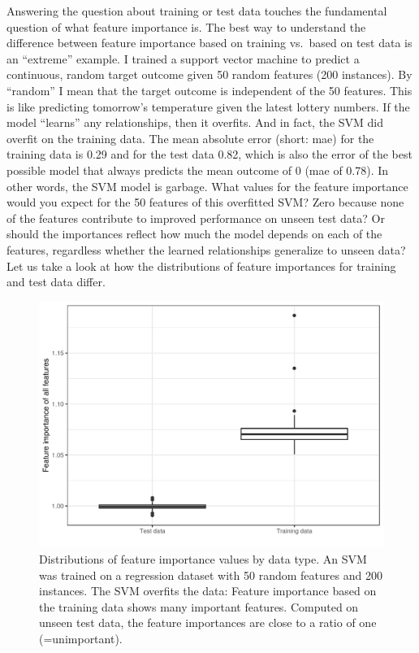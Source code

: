 \documentclass[12pt,]{krantz}
\begin{document}
Answering the question about training or test data touches the
fundamental question of what feature importance is. The best way to
understand the difference between feature importance based on training
vs.~based on test data is an ``extreme'' example. I trained a support
vector machine to predict a continuous, random target outcome given 50
random features (200 instances). By ``random'' I mean that the target
outcome is independent of the 50 features. This is like predicting
tomorrow's temperature given the latest lottery numbers. If the model
``learns'' any relationships, then it overfits. And in fact, the SVM did
overfit on the training data. The mean absolute error (short: mae) for
the training data is 0.29 and for the test data 0.82, which is also the
error of the best possible model that always predicts the mean outcome
of 0 (mae of 0.78). In other words, the SVM model is garbage. What
values for the feature importance would you expect for the 50 features
of this overfitted SVM? Zero because none of the features contribute to
improved performance on unseen test data? Or should the importances
reflect how much the model depends on each of the features, regardless
whether the learned relationships generalize to unseen data? Let us take
a look at how the distributions of feature importances for training and
test data differ.

\begin{figure}

{\centering \includegraphics[width=\textwidth]{images/feature-imp-sim-1} 

}

\caption{Distributions of feature importance values by data type. An SVM was trained on a regression dataset with 50 random features and 200 instances. The SVM overfits the data: Feature importance based on the training data shows many important features. Computed on unseen test data, the feature importances are close to a ratio of one (=unimportant).}\label{fig:feature-imp-sim}
\end{figure}
\end{document}
